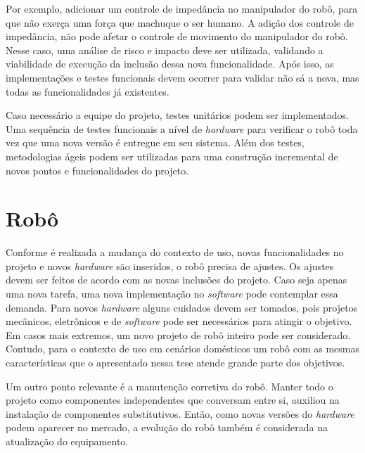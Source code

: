 Por exemplo, adicionar um controle de impedância no manipulador do robô, para que não exerça uma força que machuque o ser humano. A adição dos controle de impedância, não pode afetar o controle de movimento do manipulador do robô. Nesse caso, uma análise de risco e impacto deve ser utilizada, validando a viabilidade de execução da inclusão dessa nova funcionalidade. Após isso, as implementações e testes funcionais devem ocorrer para validar não sá a nova, mas todas as funcionalidades já existentes.

Caso necessário a equipe do projeto, testes unitários podem ser implementados. Uma sequência de testes funcionais a nível de \emph{hardware} para verificar o robô toda vez que uma nova versão é entregue em seu sistema. Além dos testes, metodologias ágeis podem ser utilizadas para uma construção incremental de novos pontos e funcionalidades do projeto.

\section{Robô}
\label{sec:robo2}
Conforme é realizada a mudança do contexto de uso, novas funcionalidades no projeto e novos \emph{hardware} são inseridos, o robô precisa de ajustes. Os ajustes devem ser feitos de acordo com as novas inclusões do projeto. Caso seja apenas uma nova tarefa, uma nova implementação no \emph{software} pode contemplar essa demanda. Para novos \emph{hardware} alguns cuidados devem ser tomados, pois projetos mecânicos, eletrônicos e de \emph{software} pode ser necessários para atingir o objetivo. Em casos mais extremos, um novo projeto de robô inteiro pode ser considerado. Contudo, para o contexto de uso em cenários domésticos um robô com as mesmas características que o apresentado nessa tese atende grande parte dos objetivos.

Um outro ponto relevante é a manutenção corretiva do robô. Manter todo o projeto como componentes independentes que conversam entre si, auxiliou na instalação de componentes substitutivos. Então, como novas versões do \emph{hardware} podem aparecer no mercado, a evolução do robô também é considerada na atualização do equipamento.

